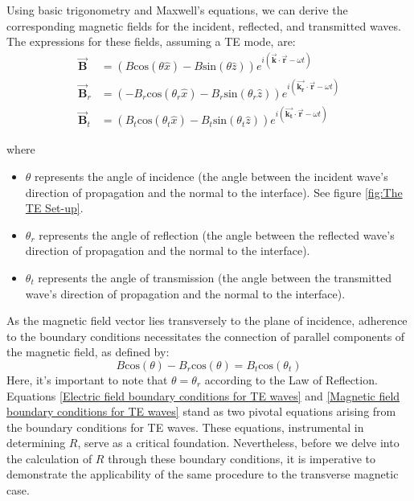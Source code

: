 Using basic trigonometry and Maxwell's equations, we can derive the corresponding magnetic fields for the incident, reflected, and transmitted waves. The expressions for these fields, assuming a TE mode, are:
\begin{align*} 
\vec{\mathbf{B}} &= (B\mathrm{cos}(\theta \hat{x}) - B\mathrm{sin}(\theta \hat{z})) e^{i(\vec{\mathbf{k}} \cdot \vec{\mathbf{r}} - \omega t)} \\
\vec{\mathbf{B}}_r &= (-B_r\mathrm{cos}(\theta_r \hat{x}) - B_r\mathrm{sin}(\theta_r \hat{z})) e^{i(\vec{\mathbf{k_r}} \cdot \vec{\mathbf{r}} - \omega t)} \\ 
\vec{\mathbf{B}}_t &= (B_t\mathrm{cos}(\theta_t \hat{x}) - B_t\mathrm{sin}(\theta_t \hat{z})) e^{i(\vec{\mathbf{k_t}} \cdot \vec{\mathbf{r}} - \omega t)}
\end{align*}

where
\begin{itemize}
    \item $\theta$ represents the angle of incidence (the angle between the incident wave's direction of propagation and the normal to the interface). See figure \ref{fig:The TE Set-up}.
    \item $\theta_r$ represents the angle of reflection (the angle between the reflected wave's direction of propagation and the normal to the interface).
    \item $\theta_t$ represents the angle of transmission (the angle between the transmitted wave's direction of propagation and the normal to the interface).
\end{itemize}

As the magnetic field vector lies transversely to the plane of incidence, adherence to the boundary conditions necessitates the connection of parallel components of the magnetic field, as defined by:
\begin{equation} \label{Magnetic field boundary conditions for TE waves}
B\mathrm{cos}(\theta) - B_r\mathrm{cos}(\theta) = B_t\mathrm{cos}(\theta_t) 
\end{equation}
Here, it's important to note that $\theta = \theta_r$ according to the Law of Reflection. Equations \ref{Electric field boundary conditions for TE waves} and \ref{Magnetic field boundary conditions for TE waves} stand as two pivotal equations arising from the boundary conditions for TE waves. These equations, instrumental in determining $R$, serve as a critical foundation. Nevertheless, before we delve into the calculation of $R$ through these boundary conditions, it is imperative to demonstrate the applicability of the same procedure to the transverse magnetic case.

